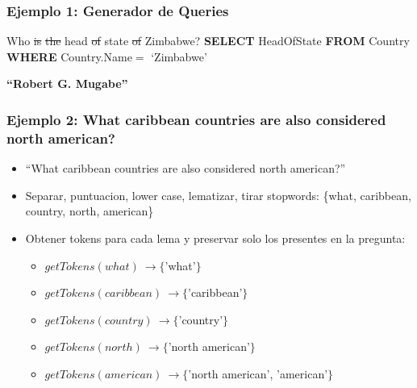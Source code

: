 \begin{frame}[t]
\frametitle{Ejemplo 1: Generador de Queries}
\Large{{\color{blue}Who} \st{is} \st{the} {\color{blue}head} \st{of} {\color{blue}state} \st{of} {\color{red}Zimbabwe}? 
\bigskip
\newline
\textbf{{\color{purple}SELECT}} HeadOfState \newline
{\color{purple}\textbf{FROM}} Country \newline
{\color{purple}\textbf{WHERE}} Country.Name$=$ {\color{green}`Zimbabwe'}
}

\bigskip

\textbf{``Robert G. Mugabe''}

\end{frame}



\begin{frame}[<+->]
\frametitle{Ejemplo 2: What caribbean countries are also considered north american?}
  \begin{itemize}
    \item ``What caribbean countries are also considered north american?''
    \item Separar, puntuacion, lower case, lematizar, tirar stopwords: \newline \{what, caribbean, country, north, american\}
    \item Obtener tokens para cada lema y preservar solo los presentes en la pregunta:
      \begin{itemize}
        \item $getTokens(what)\ \rightarrow \{$'what'$\}$
        \item $getTokens(caribbean)\ \rightarrow \{$'caribbean'$\}$
        \item $getTokens(country)\ \rightarrow  \{$'country'$\}$
        \item $getTokens(north)\ \rightarrow \{$'north american'$\}$
        \item $getTokens(american)\ \rightarrow \{$'north american', 'american'$\}$
      \end{itemize}
  \end{itemize}
  
\end{frame}
